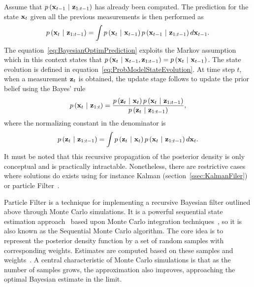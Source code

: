 Assume that $p \left( \mathbf{x}_{t - 1} \ | \ \mathbf{z}_{1:t - 1} \right)$ has already been computed. The prediction for the state $\mathbf{x}_t$ given all the previous measurements is then performed as
\begin{equation}
    \label{eq:BayesianOptimPrediction}
    p \left( \mathbf{x}_t \ | \ \mathbf{z}_{1:t - 1} \right) = \int p \left( \mathbf{x}_t \ | \ \mathbf{x}_{t - 1} \right) p \left( \mathbf{x}_{t - 1} \ | \ \mathbf{z}_{1:t - 1} \right) d\mathbf{x}_{t - 1}.
\end{equation}
The equation~\ref{eq:BayesianOptimPrediction} exploits the Markov assumption which in this context states that $p \left( \mathbf{x}_t \ | \ \mathbf{x}_{t - 1}, \mathbf{z}_{1:t - 1} \right) = p \left( \mathbf{x}_t \ | \ \mathbf{x}_{t - 1} \right)$. The state evolution is defined in equation~\ref{eq:ProbModelStateEvolution}. At time step $t$, when a measurement $\mathbf{z}_t$ is obtained, the update stage follows to update the prior belief using the Bayes' rule
\begin{equation}
    p \left( \mathbf{x}_t \ | \ \mathbf{z}_{1:t} \right) =
    \frac{
        p \left( \mathbf{z}_t \ | \ \mathbf{x}_{t} \right)
        p \left( \mathbf{x}_t \ | \ \mathbf{z}_{1:t - 1} \right)
    }{
        p \left( \mathbf{z}_t \ | \ \mathbf{z}_{1:t - 1} \right)
    },
\end{equation}
where the normalizing constant in the denominator is
\begin{equation}
    p \left( \mathbf{z}_t \ | \ \mathbf{z}_{1:t - 1} \right) =
    \int
    p \left( \mathbf{z}_t \ | \ \mathbf{x}_{t} \right)
    p \left( \mathbf{x}_t \ | \ \mathbf{z}_{1:t - 1} \right)
    d\mathbf{x}_t.
\end{equation}
It must be noted that this recursive propagation of the posterior density is only conceptual and is practically intractable. Nonetheless, there are restrictive cases where solutions do exists using for instance Kalman (section~\ref{ssec:KalmanFiler}) or particle Filter~\cite{Arulampalam2007}.

Particle Filter is a technique for implementing a recursive Bayesian filter outlined above through Monte Carlo simulations.  It is a powerful sequential state estimation approach~\cite{doucet2001introduction} based upon Monte Carlo integration techniques~\cite{mihaylova2007object}, so it is also known as the Sequential Monte Carlo algorithm. The core idea is to represent the posterior density function by a set of random samples with corresponding weights. Estimates are computed based on these samples and weights~\cite{Arulampalam2007}. A central characteristic of Monte Carlo simulations is that as the number of samples grows, the approximation also improves, approaching the optimal Bayesian estimate in the limit.

